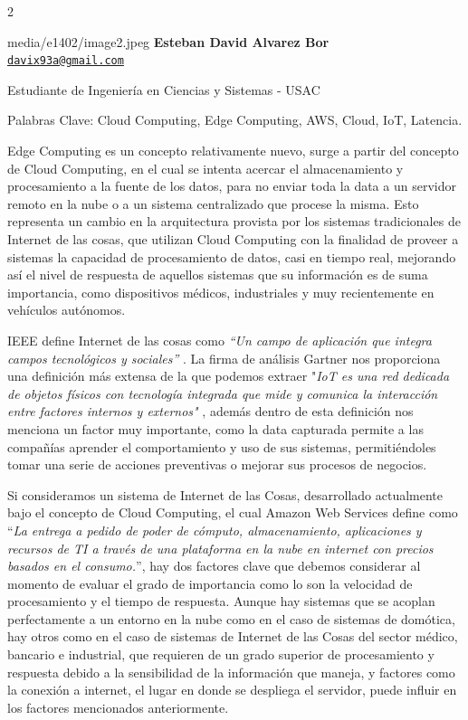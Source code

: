 \documentclass[12pt,spanish,Letterpaper,openany]{book}
\let\BeginKnitrBlock\begin \let\EndKnitrBlock\end
\begin{document}
\begin {multicols}{2}

\BeginKnitrBlock{photobiography3}{media/e1402/image2.jpeg}
\textbf{Esteban David Alvarez Bor}\\
\href{mailto:davix93a@gmail.com}{\nolinkurl{davix93a@gmail.com}}

\medskip

Estudiante de Ingeniería en Ciencias y Sistemas - USAC

\medskip

Palabras Clave: Cloud Computing, Edge Computing, AWS, Cloud, IoT, Latencia.
\EndKnitrBlock{photobiography3}

Edge Computing es un concepto relativamente nuevo, surge a partir del concepto de Cloud Computing, en el cual se intenta acercar el almacenamiento y procesamiento a la fuente de los datos, para no enviar toda la data a un servidor remoto en la nube o a un sistema centralizado que procese la misma. Esto representa un cambio en la arquitectura provista por los sistemas tradicionales de Internet de las cosas, que utilizan Cloud Computing con la finalidad de proveer a sistemas la capacidad de procesamiento de datos, casi en tiempo real, mejorando así el nivel de respuesta de aquellos sistemas que su información es de suma importancia, como dispositivos médicos, industriales y muy recientemente en vehículos autónomos.

IEEE define Internet de las cosas como \emph{``Un campo de aplicación que integra campos tecnológicos y sociales''} . La firma de análisis Gartner nos proporciona una definición más extensa de la que podemos extraer "\emph{IoT es una red dedicada de objetos físicos con tecnología integrada que mide y comunica la interacción entre factores internos y externos"} , además dentro de esta definición nos menciona un factor muy importante, como la data capturada permite a las compañías aprender el comportamiento y uso de sus sistemas, permitiéndoles tomar una serie de acciones preventivas o mejorar sus procesos de negocios.

Si consideramos un sistema de Internet de las Cosas, desarrollado actualmente bajo el concepto de Cloud Computing, el cual Amazon Web Services define como ``\emph{La entrega a pedido de poder de cómputo, almacenamiento, aplicaciones y recursos de TI a través de una plataforma en la nube en internet con precios basados en el consumo.}'', hay dos factores clave que debemos considerar al momento de evaluar el grado de importancia como lo son la velocidad de procesamiento y el tiempo de respuesta. Aunque hay sistemas que se acoplan perfectamente a un entorno en la nube como en el caso de sistemas de domótica, hay otros como en el caso de sistemas de Internet de las Cosas del sector médico, bancario e industrial, que requieren de un grado superior de procesamiento y respuesta debido a la sensibilidad de la información que maneja, y factores como la conexión a internet, el lugar en donde se despliega el servidor, puede influir en los factores mencionados anteriormente.


\end{multicols}
\end{document}
